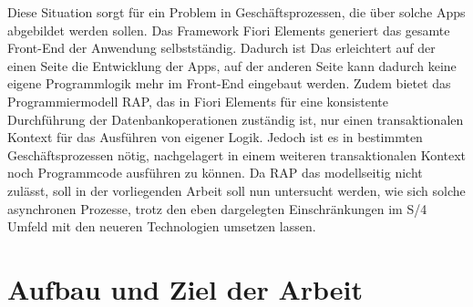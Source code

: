Diese Situation sorgt für ein Problem in Geschäftsprozessen, die über solche Apps abgebildet werden sollen. Das Framework Fiori Elements generiert das gesamte Front-End der Anwendung selbstständig. Dadurch ist Das erleichtert auf der einen Seite die Entwicklung der Apps, auf der anderen Seite kann dadurch keine eigene Programmlogik mehr im Front-End eingebaut werden. Zudem bietet das Programmiermodell RAP, das in Fiori Elements für eine konsistente Durchführung der Datenbankoperationen zuständig ist, nur einen transaktionalen Kontext für das Ausführen von eigener Logik. Jedoch ist es in bestimmten Geschäftsprozessen nötig, nachgelagert in einem weiteren transaktionalen Kontext noch Programmcode ausführen zu können. Da RAP das modellseitig nicht zulässt, soll in der vorliegenden Arbeit soll nun untersucht werden, wie sich solche asynchronen Prozesse, trotz den eben dargelegten Einschränkungen im S/4 Umfeld mit den neueren Technologien umsetzen lassen.


\section{Aufbau und Ziel der Arbeit}

